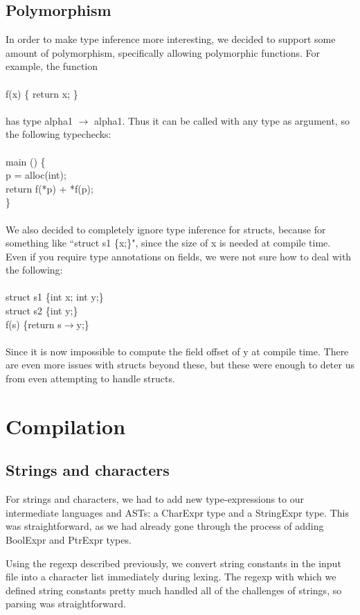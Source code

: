 \documentclass{article}
\begin{document}
\subsection{Polymorphism}
In order to make type inference more interesting, we decided to support some amount of polymorphism, specifically allowing polymorphic functions. For example, the function\\
\\
f(x) \{ return x; \}\\
\\
has type alpha1 $\to$ alpha1. Thus it can be called with any type as argument, so the following typechecks:\\
\\
main () \{\\
p = alloc(int);\\
return f(*p) + *f(p);\\
\}\\
\\
We also decided to completely ignore type inference for structs, because for something like ``struct s1 \{x;\}", since the size of x is needed at compile time. Even if you require type annotations on fields, we were not sure how to deal with the following:\\
\\
struct s1 \{int x; int y;\}\\
struct s2 \{int y;\}\\
f(s) \{return s$\to$y;\}\\
\\
Since it is now impossible to compute the field offset of y at compile time. There are even more issues with structs beyond these, but these were enough to deter us from even attempting to handle structs.

\section{Compilation}
\subsection{Strings and characters}
For strings and characters, we had to add new type-expressions to our intermediate languages and ASTs: a CharExpr type and a StringExpr type. This was straightforward, as we had already gone through the process of adding BoolExpr and PtrExpr types.

Using the regexp described previously, we convert string constants in the input file into a character list immediately during lexing. The regexp with which we defined string constants pretty much handled all of the challenges of strings, so parsing was straightforward.
\end{document}
